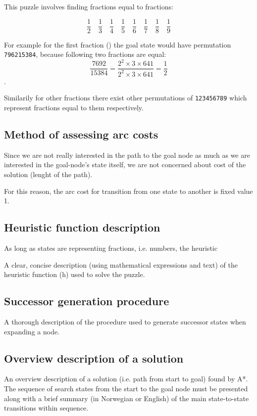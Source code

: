 \documentclass{article}
\begin{document}
This puzzle involves finding fractions equal to fractions: 

\[
 \frac{1}{2}\quad\frac{1}{3}\quad\frac{1}{4}\quad\frac{1}{5}\quad\frac{1}{6}\quad\frac{1}{7}\quad
 \frac{1}{8}\quad\frac{1}{9}
\]

For example for the first fraction () the goal state would have
permutation \texttt{796215384}, because following two fractions are equal:
\[\frac{7692}{15384} = \frac{2^2 \times 3 \times 641}{2^2 \times 3 \times 641} =
\frac{1}{2}\].

Similarily for other fractions there exist other permutations of
\texttt{123456789} which represent fractions equal to them respectively.

\subsection{Method of assessing arc costs}
Since we are not really interested in the path to the goal node as much as we
are interested in the goal-node's state itself, we are not concerned about cost
of the solution (lenght of the path).

For this reason, the arc cost for transition from one state to another is fixed
value 1.

\subsection{Heuristic function description}

As long as states are representing fractions, i.e. numbers, the heuristic

A clear, concise description (using mathematical expressions and text) of the
heuristic function (h) used to solve the puzzle.
\subsection{Successor generation procedure}
A thorough description of the procedure used to generate successor states when
expanding a node.
\subsection{Overview description of a solution}
An overview description of a solution (i.e. path from start to goal) found by
A*. The sequence of search states from the start to the goal node must be
presented along with a brief summary (in Norwegian or English) of the main
state-to-state transitions within sequence.
\end{document}
